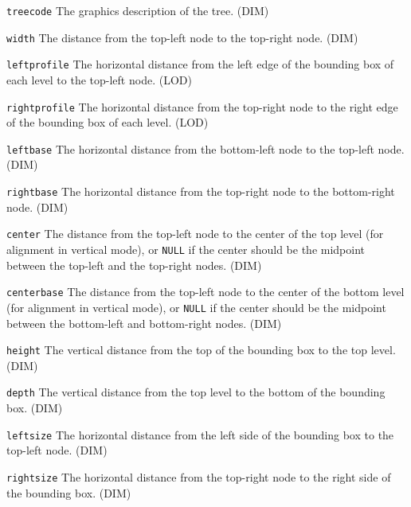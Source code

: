 \documentclass[11pt,english,BCOR10mm,DIV12,bibliography=totoc,parskip=false,smallheadings
    headexclude,footexclude,oneside]{pst-doc}
\begin{document}
\begin{compactdesc}%
  \item[\texttt{treecode}] The graphics description of the tree. (DIM)

  \item[\texttt{width}] The distance from the top-left node to the top-right node. (DIM)

  \item[\texttt{leftprofile}] The horizontal distance from the left edge of the bounding box of each level to the top-left node. (LOD)

  \item[\texttt{rightprofile}] The horizontal distance from the top-right node to the right edge of the bounding box of each level. (LOD)

  \item[\texttt{leftbase}] The horizontal distance from the bottom-left node to the top-left node. (DIM)

  \item[\texttt{rightbase}] The horizontal distance from the top-right node to the bottom-right node. (DIM)

  \item[\texttt{center}] The distance from the top-left node to the center of the top level 
  (for alignment in vertical mode), or \verb=NULL= if the center should be the midpoint 
  between the top-left and the top-right nodes. (DIM)

  \item[\texttt{centerbase}] The distance from the top-left node to the center of the bottom level 
  (for alignment in vertical mode), or \verb=NULL= if the center should be the midpoint between the 
  bottom-left and bottom-right nodes. (DIM)

  \item[\texttt{height}] The vertical distance from the top of the bounding box to the top  level. (DIM)

  \item[\texttt{depth}] The vertical distance from the top level to the bottom of the bounding box. (DIM)

  \item[\texttt{leftsize}] The horizontal distance from the left side of the bounding box to the top-left node. (DIM)

  \item[\texttt{rightsize}] The horizontal distance from the top-right node to the right side of the bounding box. (DIM)


\end{compactdesc}
\end{document}
